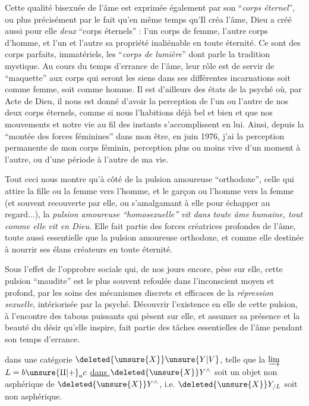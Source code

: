 Cette qualité bisexuée de l'âme est exprimée également par son ``\textit{corps éternel}'', ou plus précisément par le fait qu'en même temps qu'Il créa l'âme, Dieu a créé aussi pour elle \textit{deux} ``corps éternels'' : l'un corps de femme, l'autre corps d'homme, et l'un et l'autre sa propriété inaliénable en toute éternité. Ce sont des corps parfaits, immatériels, les ``\textit{corps de lumière}'' dont parle la tradition mystique. Au cours du temps d'errance de l'âme, leur rôle est de servir de ``maquette'' aux corps qui seront les siens dans ses différentes incarnations soit comme femme, soit comme homme. Il est d'ailleurs des états de la psyché où, par Acte de Dieu, il nous est donné d'avoir la perception de l'un ou l'autre de nos deux corps éternels, comme si nous l'habitions déjà bel et bien et que nos mouvements et notre vie au fil des instants s'accomplissent en lui. Ainsi, depuis la ``montée des forces féminines'' dans mon être, en juin 1976, j'ai la perception permanente de mon corps féminin, perception plus ou moins vive d'un moment à l'autre, ou d'une période à l'autre de ma vie.

Tout ceci nous montre qu'à côté de la pulsion amoureuse ``orthodoxe'', celle qui attire la fille ou la femme vers l'homme, et le garçon ou l'homme vers la femme (et souvent recouverte par elle, ou s'amalgamant à elle pour échapper au regard...), la \textit{pulsion amoureuse ``homosexuelle'' vit dans toute âme humaine, tout comme elle vit en Dieu.} Elle fait partie des forces créatrices profondes de l'âme, toute aussi essentielle que la pulsion amoureuse orthodoxe, et comme elle destinée à nourrir ses élans créateurs en toute éternité.

Sous l'effet de l'opprobre sociale qui, de nos jours encore, pèse sur elle, cette pulsion ``maudite'' est le plus souvent refoulée dans l'inconscient moyen et profond, par les soins des mécanismes discrets et efficaces de la \textit{répression sexuelle}, intériorisée par la psyché. Découvrir l'existence en elle de cette pulsion, à l'encontre des tabous puissants qui pèsent sur elle, et assumer sa présence et la beauté du désir qu'elle inspire, fait partie des tâches essentielles de l'âme pendant son temps d'errance.


dans une catégorie $\deleted{\unsure{X}}\unsure{Y|V}$, telle que la  $\varinjlim$ $L=b\unsure{\amalg|+}_a c$ \uline{dans $\deleted{\unsure{X}}Y^\wedge$} soit un objet non asphérique de $\deleted{\unsure{X}}Y^\wedge$, i.e. $\deleted{\unsure{X}}Y_{/L}$ soit non asphérique.

